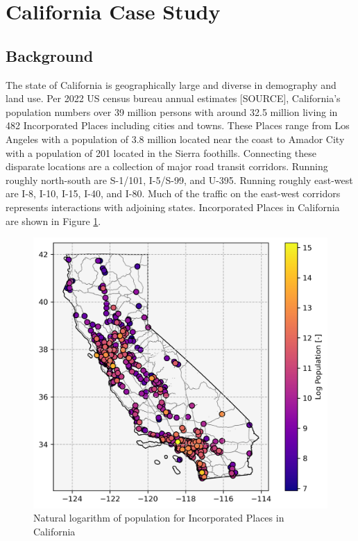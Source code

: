 \section*{California Case Study}

\subsection*{Background}

The state of California is geographically large and diverse in demography and land use. Per 2022 US census bureau annual estimates [SOURCE], California's population numbers over 39 million persons with around 32.5 million living in 482 Incorporated Places including cities and towns. These Places range from Los Angeles with a population of 3.8 million located near the coast to Amador City with a population of 201 located in the Sierra foothills. Connecting these disparate locations are a collection of major road transit corridors. Running roughly north-south are S-1/101, I-5/S-99, and U-395. Running roughly east-west are I-8, I-10, I-15, I-40, and I-80. Much of the traffic on the east-west corridors represents interactions with adjoining states. Incorporated Places in California are shown in Figure \ref{fig:california_incorporated_places}.

\begin{figure}[H]
	\centering
	\includegraphics[width = \linewidth]{figs/california_incorporated_places.png}
	\caption{Natural logarithm of population for Incorporated Places in California}
	\label{fig:california_incorporated_places}
\end{figure}

